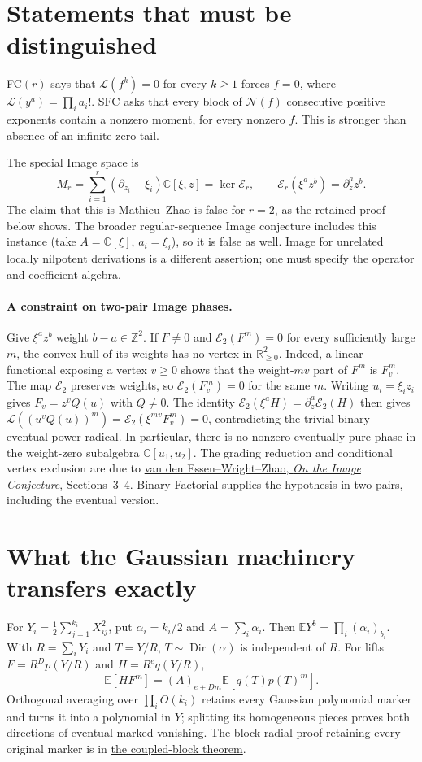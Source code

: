 \documentclass[11pt]{article}
\newcommand{\Lfac}{\mathcal L}
\newcommand{\C}{\mathbb C}
\begin{document}
\section*{Statements that must be distinguished}
FC$(r)$ says that $\Lfac(f^k)=0$ for every $k\geq1$ forces $f=0$, where
$\Lfac(y^a)=\prod_i a_i!$. SFC asks that every block of $\mathcal N(f)$
consecutive positive exponents contain a nonzero moment, for every
nonzero $f$. This is stronger than absence of an infinite zero tail.

The special Image space is
\[
 M_r=\sum_{i=1}^r(\partial_{z_i}-\xi_i)\C[\xi,z]=\ker\mathcal E_r,
 \qquad \mathcal E_r(\xi^a z^b)=\partial_z^a z^b.
\]
The claim that this is Mathieu--Zhao is false for $r=2$, as the retained
proof below shows. The broader regular-sequence Image conjecture includes
this instance (take $A=\C[\xi]$, $a_i=\xi_i$), so it is false as well.
Image for unrelated locally nilpotent derivations is a different assertion;
one must specify the operator and coefficient algebra.

\paragraph{A constraint on two-pair Image phases.}
Give $\xi^a z^b$ weight $b-a\in\mathbb Z^2$. If $F\ne0$ and
$\mathcal E_2(F^m)=0$ for every sufficiently large $m$, the convex hull
of its weights has no vertex in $\mathbb R_{\ge0}^2$. Indeed, a linear
functional exposing a vertex $v\ge0$ shows that the weight-$mv$ part of
$F^m$ is $F_v^m$. The map $\mathcal E_2$ preserves weights, so
$\mathcal E_2(F_v^m)=0$ for the same $m$. Writing
$u_i=\xi_i z_i$ gives $F_v=z^v Q(u)$ with $Q\ne0$. The identity
$\mathcal E_2(\xi^a H)=\partial_z^a\mathcal E_2(H)$ then gives
$\Lfac((u^v Q(u))^m)=\mathcal E_2(\xi^{mv}F_v^m)=0$, contradicting
the trivial binary eventual-power radical. In particular, there is no
nonzero eventually pure phase in the weight-zero subalgebra $\C[u_1,u_2]$.
The grading reduction and conditional vertex exclusion are due to
\href{https://arxiv.org/abs/1008.3962v2}{van den Essen--Wright--Zhao,
\emph{On the Image Conjecture}, Sections~3--4}. Binary Factorial
supplies the hypothesis in two pairs, including the eventual version.

\section*{What the Gaussian machinery transfers exactly}
For $Y_i=\frac12\sum_{j=1}^{k_i}X_{ij}^2$, put
$\alpha_i=k_i/2$ and $A=\sum_i\alpha_i$. Then
$\mathbb E Y^b=\prod_i(\alpha_i)_{b_i}$. With $R=\sum_iY_i$ and $T=Y/R$,
$T\sim\operatorname{Dir}(\alpha)$ is independent of $R$.
For lifts $F=R^Dp(Y/R)$ and $H=R^eq(Y/R)$,
\[
 \mathbb E[HF^m]=(A)_{e+Dm}\mathbb E[q(T)p(T)^m].             \tag{5}
\]
Orthogonal averaging over $\prod_i O(k_i)$ retains every Gaussian
polynomial marker and turns it into a polynomial in $Y$; splitting its
homogeneous pieces proves both directions of eventual marked vanishing.
The block-radial proof retaining every original marker is in
\href{COUPLED_BLOCK_PERIODS.tex}{the coupled-block theorem}.
\end{document}
